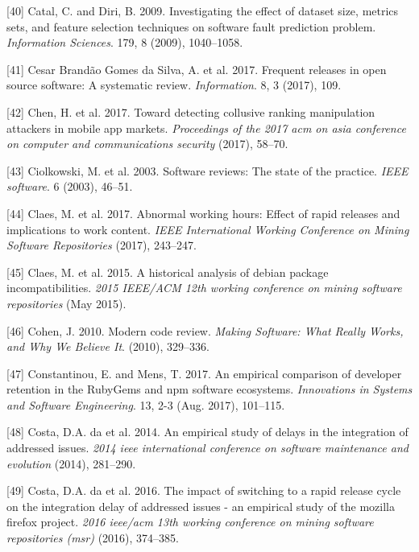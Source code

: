 \documentclass[]{book}
\begin{document}
\hypertarget{ref-Catal2009investigating}{}
{[}40{]} Catal, C. and Diri, B. 2009. Investigating the effect of
dataset size, metrics sets, and feature selection techniques on software
fault prediction problem. \emph{Information Sciences}. 179, 8 (2009),
1040--1058.

\hypertarget{ref-cesar2017a}{}
{[}41{]} Cesar Brandão Gomes da Silva, A. et al. 2017. Frequent releases
in open source software: A systematic review. \emph{Information}. 8, 3
(2017), 109.

\hypertarget{ref-chen2017toward}{}
{[}42{]} Chen, H. et al. 2017. Toward detecting collusive ranking
manipulation attackers in mobile app markets. \emph{Proceedings of the
2017 acm on asia conference on computer and communications security}
(2017), 58--70.

\hypertarget{ref-ciolkowski2003software}{}
{[}43{]} Ciolkowski, M. et al. 2003. Software reviews: The state of the
practice. \emph{IEEE software}. 6 (2003), 46--51.

\hypertarget{ref-claes2017a}{}
{[}44{]} Claes, M. et al. 2017. Abnormal working hours: Effect of rapid
releases and implications to work content. \emph{IEEE International
Working Conference on Mining Software Repositories} (2017), 243--247.

\hypertarget{ref-Claes2015}{}
{[}45{]} Claes, M. et al. 2015. A historical analysis of debian package
incompatibilities. \emph{2015 IEEE/ACM 12th working conference on mining
software repositories} (May 2015).

\hypertarget{ref-cohen2010modern}{}
{[}46{]} Cohen, J. 2010. Modern code review. \emph{Making Software: What
Really Works, and Why We Believe It}. (2010), 329--336.

\hypertarget{ref-Constantinou2017}{}
{[}47{]} Constantinou, E. and Mens, T. 2017. An empirical comparison of
developer retention in the RubyGems and npm software ecosystems.
\emph{Innovations in Systems and Software Engineering}. 13, 2-3 (Aug.
2017), 101--115.

\hypertarget{ref-da2014a}{}
{[}48{]} Costa, D.A. da et al. 2014. An empirical study of delays in the
integration of addressed issues. \emph{2014 ieee international
conference on software maintenance and evolution} (2014), 281--290.

\hypertarget{ref-da2016a}{}
{[}49{]} Costa, D.A. da et al. 2016. The impact of switching to a rapid
release cycle on the integration delay of addressed issues - an
empirical study of the mozilla firefox project. \emph{2016 ieee/acm 13th
working conference on mining software repositories (msr)} (2016),
374--385.
\end{document}

